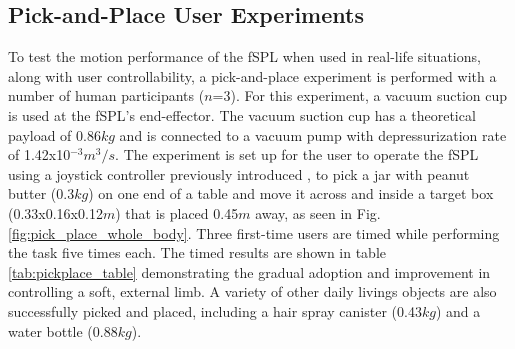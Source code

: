 \documentclass[letterpaper, 10 pt, conference]{ieeeconf}  %
\begin{document}






\subsection{Pick-and-Place User Experiments}

To test the motion performance of the fSPL when used in real-life situations, along with user controllability, a pick-and-place experiment is performed with a number of human participants ($n$=3). For this experiment, a vacuum suction cup is used at the fSPL's end-effector. The vacuum suction cup has a theoretical payload of 0.86$kg$ and is connected to a vacuum pump with depressurization rate of 1.42x10$^{-3}m^3/s$. The experiment is set up for the user to operate the fSPL using a joystick controller previously introduced \cite{nguyen2018}, to pick a jar with peanut butter (0.3$kg$) on one end of a table and move it across and inside a target box (0.33x0.16x0.12$m$) that is placed 0.45$m$ away, as seen in Fig. \ref{fig:pick_place_whole_body}. Three first-time users are timed while performing the task five times each.  %
The timed results are shown in table \ref{tab:pickplace_table} demonstrating the gradual adoption and improvement in controlling a soft, external limb. A variety of other daily livings objects are also successfully picked and placed, including a hair spray canister  (0.43$kg$) and a water bottle (0.88$kg$).
% 
% 
% 
%
%
% 
% 
\end{document}
